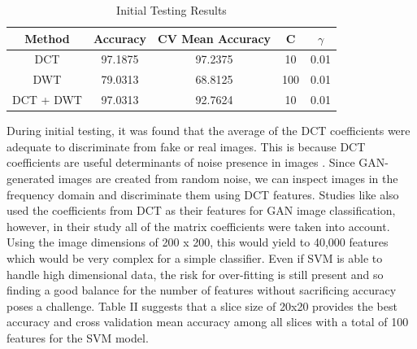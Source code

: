 \documentclass[journal]{./IEEE/IEEEtran}
\begin{document}
\begin{table}[H]
\centering
\begin{tabular}{|c|c|c|c|c|}
\hline
Method    & Accuracy & CV Mean Accuracy & C   & $\gamma$    \\ \hline
DCT       & 97.1875  & 97.2375          & 10  & 0.01 \\ \hline
DWT       & 79.0313  & 68.8125          & 100 & 0.01 \\ \hline
DCT + DWT & 97.0313  & 92.7624          & 10  & 0.01 \\ \hline
\end{tabular}
\caption{Initial Testing Results}
\end{table}

During initial testing, it was found that the average of the DCT coefficients were adequate to discriminate from fake or real images. This is because DCT coefficients are useful determinants of noise presence in images \cite{noise-estimation}. Since GAN-generated images are created from random noise, we can inspect images in the frequency domain and discriminate them using DCT features. Studies like \cite{lev-freq-dct} also used the coefficients from DCT as their features for GAN image classification, however, in their study all of the matrix coefficients were taken into account. Using the image dimensions of 200 x 200, this would yield to 40,000 features which would be very complex for a simple classifier. Even if SVM is able to handle high dimensional data, the risk for over-fitting is still present and so finding a good balance for the number of features without sacrificing accuracy poses a challenge. Table II suggests that a slice size of 20x20 provides the best accuracy and cross validation mean accuracy among all slices with a total of 100 features for the SVM model. 
\end{document}
